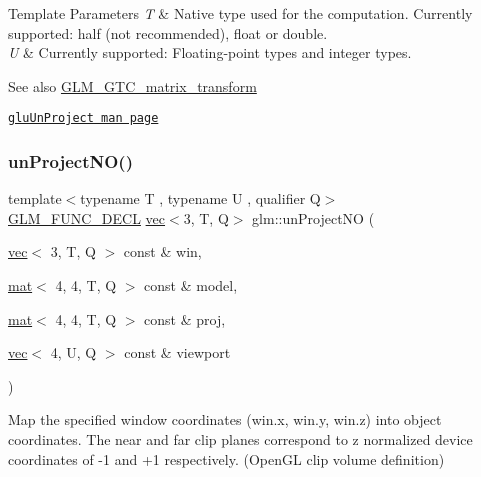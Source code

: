 \begin{DoxyTemplParams}{Template Parameters}
{\em T} & Native type used for the computation. Currently supported\+: half (not recommended), float or double. \\
\hline
{\em U} & Currently supported\+: Floating-\/point types and integer types. \\
\hline
\end{DoxyTemplParams}
\begin{DoxySeeAlso}{See also}
\mbox{\hyperlink{group__gtc__matrix__transform}{G\+L\+M\+\_\+\+G\+T\+C\+\_\+matrix\+\_\+transform}} 

\href{https://www.khronos.org/registry/OpenGL-Refpages/gl2.1/xhtml/gluUnProject.xml}{\tt glu\+Un\+Project man page} 
\end{DoxySeeAlso}
\mbox{\label{group__gtc__matrix__transform_gae089ba9fc150ff69c252a20e508857b5}} 
\subsubsection{\texorpdfstring{un\+Project\+N\+O()}{unProjectNO()}}
{\footnotesize\ttfamily template$<$typename T , typename U , qualifier Q$>$ \\
\mbox{\hyperlink{setup_8hpp_ab2d052de21a70539923e9bcbf6e83a51}{G\+L\+M\+\_\+\+F\+U\+N\+C\+\_\+\+D\+E\+CL}} \mbox{\hyperlink{structglm_1_1vec}{vec}}$<$3, T, Q$>$ glm\+::un\+Project\+NO (\begin{DoxyParamCaption}\item[{\mbox{\hyperlink{structglm_1_1vec}{vec}}$<$ 3, T, Q $>$ const \&}]{win,  }\item[{\mbox{\hyperlink{structglm_1_1mat}{mat}}$<$ 4, 4, T, Q $>$ const \&}]{model,  }\item[{\mbox{\hyperlink{structglm_1_1mat}{mat}}$<$ 4, 4, T, Q $>$ const \&}]{proj,  }\item[{\mbox{\hyperlink{structglm_1_1vec}{vec}}$<$ 4, U, Q $>$ const \&}]{viewport }\end{DoxyParamCaption})}

Map the specified window coordinates (win.\+x, win.\+y, win.\+z) into object coordinates. The near and far clip planes correspond to z normalized device coordinates of -\/1 and +1 respectively. (Open\+GL clip volume definition)


